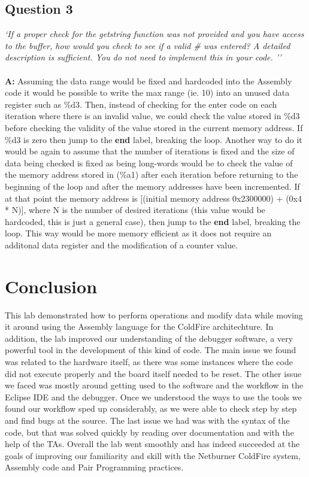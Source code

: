 \documentclass[letterpaper]{article}
\begin{document}
      \subsection{Question 3} \textit{`If a proper check for the getstring
      function was not provided and you have access to the buffer, how would you
      check to see if a valid \# was entered? A detailed description is
      sufficient. You do not need to implement this in your code. ''}
      \\ \\
      \noindent\textbf{A:}
        Assuming the data range would be fixed and hardcoded into the Assembly code it would be possible to
        write the max range (ie. 10) into an unused data register such as \%d3.  Then, instead of checking
        for the enter code on each iteration where there is an invalid value, we could check the value stored in
        \%d3 before checking the validity of the value stored in the current memory address.  If \%d3 is
        zero then jump to the \textbf{end} label, breaking the loop.  Another way to do it would be again
        to assume that the number of iterations is fixed and the size of data being checked is fixed as being
        long-words would be to check the value of the memory address stored in (\%a1) after each iteration
        before returning to the beginning of the loop and after the memory addresses have been incremented.
        If at that point the memory address is [(initial memory address 0x2300000) + (0x4 * N)], where N is
        the number of desired iterations (this value would be hardcoded, this is just a general case), then
        jump to the \textbf{end} label, breaking the loop.  This way would be more memory efficient as it
        does not require an additonal data register and the modification of a counter value.

\section{Conclusion}
  This lab demonstrated how to perform operations
  and modify data while moving it around using the Assembly language for the ColdFire architechture.
  In addition, the lab improved our understanding of the debugger software, a very powerful
  tool in the development of this kind of code.  The main issue we found was related
  to the hardware itself, as there was some instances where the code did not execute
  properly and the board itself needed to be reset.  The other issue we faced was mostly
  around getting used to the software and the workflow in the Eclipse IDE and
  the debugger.  Once we understood the ways to use the tools we found our workflow sped up
  considerably, as we were able to check step by step and find bugs at the source.  The last
  issue we had was with the syntax of the code, but that was solved quickly by reading over
  documentation and with the help of the TAs.  Overall the lab went smoothly and has indeed
  succeeded at the goals of improving our familiarity and skill with the Netburner ColdFire system,
  Assembly code and Pair Programming practices.
\end{document}

